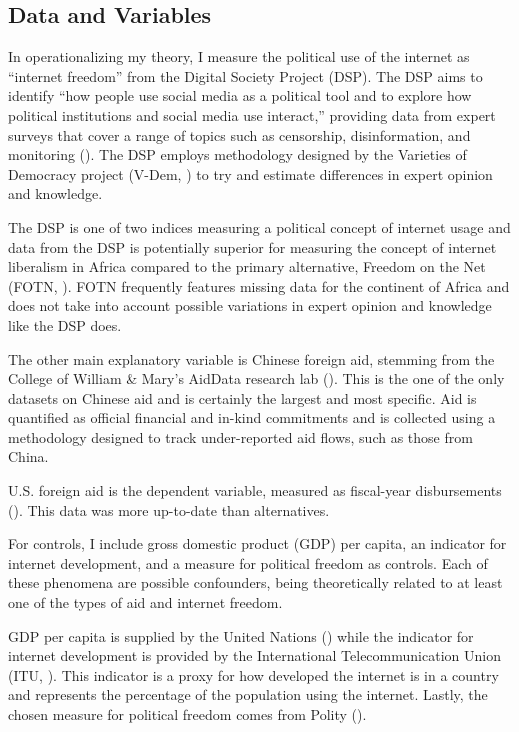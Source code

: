 \documentclass[12pt]{article}
\begin{document}
\subsection*{Data and Variables}
In operationalizing my theory, I measure the political use of the internet as ``internet freedom'' from the Digital Society Project (DSP). The DSP aims to identify ``how people use social media as a political tool and to explore how political institutions and social media use interact,'' providing data from expert surveys that cover a range of topics such as censorship, disinformation, and monitoring (\cite{mechkova2022}). The DSP employs methodology designed by the Varieties of Democracy project (V-Dem, \cite{coppedge2022}) to try and estimate differences in expert opinion and knowledge.

The DSP is one of two indices measuring a political concept of internet usage and data from the DSP is potentially superior for measuring the concept of internet liberalism in Africa compared to the primary alternative, Freedom on the Net (FOTN, \cite{freedomhouse2022}). FOTN frequently features missing data for the continent of Africa and does not take into account possible variations in expert opinion and knowledge like the DSP does.

The other main explanatory variable is Chinese foreign aid, stemming from the College of William \& Mary's AidData research lab (\cite{custer2021}). This is the one of the only datasets on Chinese aid and is certainly the largest and most specific. Aid is quantified as official financial and in-kind commitments and is collected using a methodology designed to track under-reported aid flows, such as those from China.

U.S. foreign aid is the dependent variable, measured as fiscal-year disbursements (\cite{u.s.agencyforinternationaldevelopment2022}). This data was more up-to-date than alternatives.

For controls, I include gross domestic product (GDP) per capita, an indicator for internet development, and a measure for political freedom as controls. Each of these phenomena are possible confounders, being theoretically related to at least one of the types of aid and internet freedom. 

GDP per capita is supplied by the United Nations (\cite{unitednationsstatisticsdivision2019}) while the indicator for internet development is provided by the International Telecommunication Union (ITU, \cite{itu2022}). This indicator is a proxy for how developed the internet is in a country and represents the percentage of the population using the internet. Lastly, the chosen measure for political freedom comes from Polity (\cite{marshall2018}).
\end{document}

